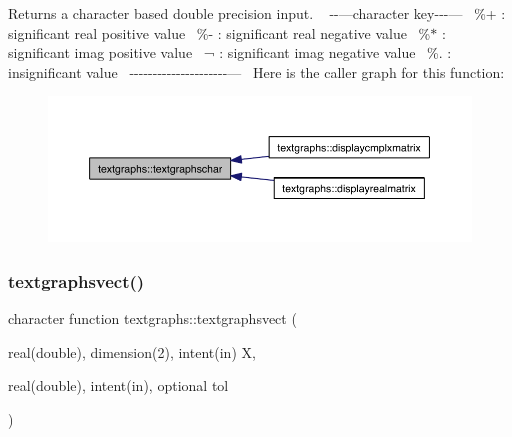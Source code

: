 Returns a character based double precision input. ~\newline
-\/-\/---character key-\/-\/-\/---~\newline
 \%+ \+: significant real positive value~\newline
 \%-\/ \+: significant real negative value~\newline
 \%$\ast$ \+: significant imag positive value~\newline
 ¬ \+: significant imag negative value~\newline
 \%. \+: insignificant value~\newline
-\/-\/-\/-\/-\/-\/-\/-\/-\/-\/-\/-\/-\/-\/-\/-\/-\/-\/-\/-\/-\/---~\newline
 Here is the caller graph for this function\+:\nopagebreak
\begin{figure}[H]
\begin{center}
\leavevmode
\includegraphics[width=350pt]{namespacetextgraphs_accad584018d6cbbc199cc77b34ef2db5_icgraph}
\end{center}
\end{figure}
\mbox{\label{namespacetextgraphs_a3ce903686e3a69e50f07b7f1461c53c6}} 
\subsubsection{\texorpdfstring{textgraphsvect()}{textgraphsvect()}}
{\footnotesize\ttfamily character function textgraphs\+::textgraphsvect (\begin{DoxyParamCaption}\item[{real(double), dimension(2), intent(in)}]{X,  }\item[{real(double), intent(in), optional}]{tol }\end{DoxyParamCaption})\hspace{0.3cm}{\ttfamily [private]}}



